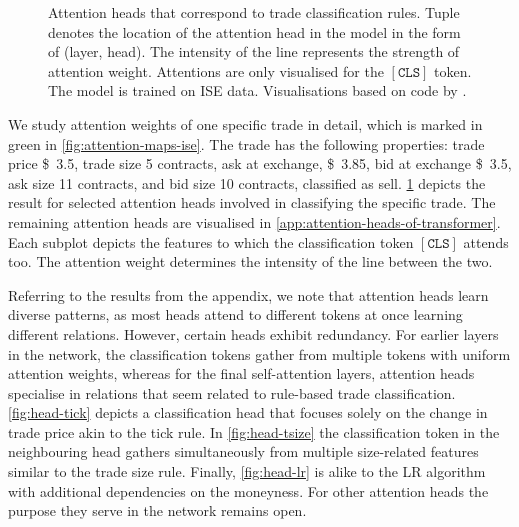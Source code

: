 \begin{figure}[h!]
    \hfill
    \hfill
    \caption[Rule-like Roles of Selected Attention Heads]{Attention heads that correspond to trade classification rules. Tuple denotes the location of the attention head in the model in the form of (layer, head). The intensity of the line represents the strength of attention weight. Attentions are only visualised for the $\mathtt{[CLS]}$ token. The model is trained on \gls{ISE} data. Visualisations based on code by \textcite[][4]{clarkWhatDoesBERT2019}.}
    \label{fig:rule-like-attention-heads}
\end{figure}

We study attention weights of one specific trade in detail, which is marked in green in \cref{fig:attention-maps-ise}. The trade has the following properties: trade price \SI{3.5}[\$]{}, trade size \SI{5}[]{} contracts, ask at exchange, \SI{3.85}[\$]{}, bid at exchange \SI{3.5}[\$]{}, ask size \SI{11}[]{} contracts, and bid size \SI{10}[]{} contracts, classified as sell. \cref{fig:rule-like-attention-heads} depicts the result for selected attention heads involved in classifying the specific trade. The remaining attention heads are visualised in \cref{app:attention-heads-of-transformer}. Each subplot depicts the features to which the classification token $\mathtt{[CLS]}$ attends too. The attention weight determines the intensity of the line between the two. 

Referring to the results from the appendix, we note that attention heads learn diverse patterns, as most heads attend to different tokens at once learning different relations. However, certain heads exhibit redundancy. For earlier layers in the network, the classification tokens gather from multiple tokens with uniform attention weights, whereas for the final self-attention layers, attention heads specialise in relations that seem related to rule-based trade classification. \cref{fig:head-tick} depicts a classification head that focuses solely on the change in trade price akin to the tick rule. In \cref{fig:head-tsize} the classification token in the neighbouring head gathers simultaneously from multiple size-related features similar to the trade size rule. Finally, \cref{fig:head-lr} is alike to the \gls{LR} algorithm with additional dependencies on the moneyness. For other attention heads the purpose they serve in the network remains open. 

